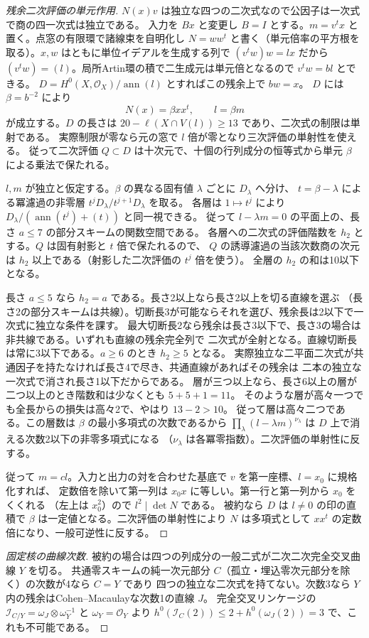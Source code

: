 \begin{proof}[残余二次評価の単元作用]
$N(x)v$ は独立な四つの二次式なので公因子は一次式で商の四一次式は独立である。
入力を $Bx$ と変更し $B=I$ とする。$m=v^tx$ と置く。点窓の有限環で諸線束を自明化し
$N=ww^t$ と書く（単元倍率の平方根を取る）。$x,w$ はともに単位イデアルを生成する列で
$(v^tw)w=lx$ だから $(v^tw)=(l)$。局所Artin環の積で二生成元は単元倍となるので $v^tw=b l$ とできる。
$D=H^0(X,\mathcal O_X)/\operatorname{ann}(l)$ とすればこの残余上で $bw=x$。
$D$ には $\beta=b^{-2}$ により
\[
                    N(x)=\beta xx^t,\qquad l=\beta m
\]
が成立する。$D$ の長さは $20-\ell(X\cap V(l))\ge13$ であり、二次式の制限は単射である。
実際制限が零なら元の窓で $l$ 倍が零となり三次評価の単射性を使える。
従って二次評価 $Q\subset D$ は十次元で、十個の行列成分の恒等式から単元 $\beta$ による乗法で保たれる。

$l,m$ が独立と仮定する。$\beta$ の異なる固有値 $\lambda$ ごとに $D_\lambda$ へ分け、
$t=\beta-\lambda$ による冪濾過の非零層 $t^j D_\lambda/t^{j+1}D_\lambda$ を取る。
各層は $1\mapsto t^j$ により $D_\lambda/(\operatorname{ann}(t^j)+(t))$ と同一視できる。
従って $l-\lambda m=0$ の平面上の、長さ $a\le7$ の部分スキームの関数空間である。
各層への二次式の評価階数を $h_2$ とする。$Q$ は固有射影と $t$ 倍で保たれるので、
$Q$ の誘導濾過の当該次数商の次元は $h_2$ 以上である（射影した二次評価の $t^j$ 倍を使う）。
全層の $h_2$ の和は10以下となる。

長さ $a\le5$ なら $h_2=a$ である。長さ2以上なら長さ2以上を切る直線を選ぶ
（長さ2の部分スキームは共線）。切断長3が可能ならそれを選び、残余長は2以下で一次式に独立な条件を課す。
最大切断長2なら残余は長さ3以下で、長さ3の場合は非共線である。いずれも直線の残余完全列で
二次式が全射となる。直線切断長は常に3以下である。$a\ge6$ のとき $h_2\ge5$ となる。
実際独立な二平面二次式が共通因子を持たなければ長さ4で尽き、共通直線があればその残余は
二本の独立な一次式で消され長さ1以下だからである。
層が三つ以上なら、長さ6以上の層が二つ以上のとき階数和は少なくとも $5+5+1=11$。
そのような層が高々一つでも全長からの損失は高々2で、やはり $13-2>10$。
従って層は高々二つである。この層数は $\beta$ の最小多項式の次数であるから
$\prod_\lambda (l-\lambda m)^{\nu_\lambda}$ は $D$ 上で消える次数2以下の非零多項式になる
（$\nu_\lambda$ は各冪零指数）。二次評価の単射性に反する。

従って $m=c l$。入力と出力の対を合わせた基底で $v$ を第一座標、$l=x_0$ に規格化すれば、
定数倍を除いて第一列は $x_0 x$ に等しい。第一行と第一列から $x_0$ をくくれる
（左上は $x_0^2$）ので $l^2\mid\det N$ である。
被約なら $D$ は $l\ne0$ の印の直積で $\beta$ は一定値となる。二次評価の単射性により
$N$ は多項式として $xx^t$ の定数倍になり、一般可逆性に反する。
\end{proof}
\begin{proof}[固定核の曲線次数]
被約の場合は四つの列成分の一般二式が二次二次完全交叉曲線 $Y$ を切る。
共通零スキームの純一次元部分 $C$（孤立・埋込零次元部分を除く）の次数が4なら $C=Y$ であり
四つの独立な二次式を持てない。次数3なら $Y$ 内の残余はCohen--Macaulayな次数1の直線 $J$。
完全交叉リンケージの $\mathcal I_{C/Y}=\omega_J\otimes\omega_Y^{-1}$ と $\omega_Y=\mathcal O_Y$ より
$h^0(\mathcal I_C(2))\le2+h^0(\omega_J(2))=3$ で、これも不可能である。
\end{proof}

